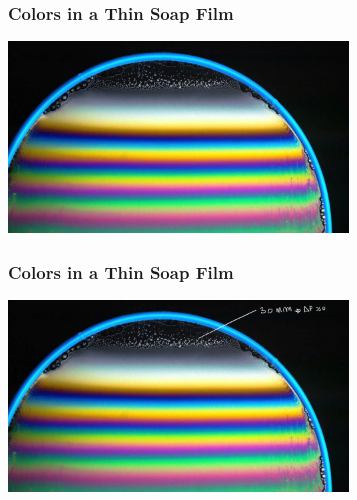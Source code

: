\documentclass[]{beamer}
\begin{document}
\begin{frame}

\frametitle{Colors in a Thin Soap Film}


  
     \begin{center}
  \includegraphics[height=2.0in]{images5/soap4.jpg}
\end{center}



  \end{frame}



\begin{frame}

\frametitle{Colors in a Thin Soap Film}


  
     \begin{center}
  \includegraphics[height=2.0in]{images5/soap4b.jpg}
\end{center}



  \end{frame}



\end{document}
